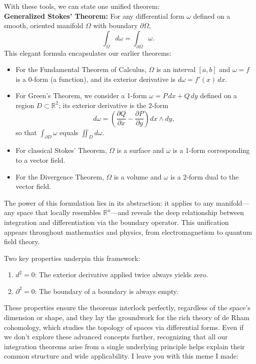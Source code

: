\noindent With these tools, we can state one unified theorem: \\

\noindent \textbf{Generalized Stokes' Theorem:} For any differential form \(\omega\) defined on a smooth, oriented manifold \(\Omega\) with boundary \(\partial\Omega\),
\[
\int_\Omega d\omega = \int_{\partial\Omega} \omega.
\]
This elegant formula encapsulates our earlier theorems:
\begin{itemize}
    \item For the Fundamental Theorem of Calculus, \(\Omega\) is an interval \([a,b]\) and \(\omega = f\) is a 0-form (a function), and its exterior derivative is \(d\omega = f'(x)\,dx\).
    \item For Green's Theorem, we consider a 1-form \(\omega = P\,dx + Q\,dy\) defined on a region \(D \subset \mathbb{R}^2\); its exterior derivative is the 2-form 
    \[
    d\omega = \left(\frac{\partial Q}{\partial x} - \frac{\partial P}{\partial y}\right) dx \wedge dy,
    \]
    so that \(\int_{\partial D} \omega\) equals \(\iint_D d\omega\).
    \item For classical Stokes' Theorem, \(\Omega\) is a surface and \(\omega\) is a 1-form corresponding to a vector field.
    \item For the Divergence Theorem, \(\Omega\) is a volume and \(\omega\) is a 2-form dual to the vector field.
\end{itemize}

\noindent The power of this formulation lies in its abstraction: it applies to any manifold—any space that locally resembles \(\mathbb{R}^n\)—and reveals the deep relationship between integration and differentiation via the boundary operator. This unification appears throughout mathematics and physics, from electromagnetism to quantum field theory.

\noindent Two key properties underpin this framework:
\begin{enumerate}
    \item \(d^2 = 0\): The exterior derivative applied twice always yields zero.
    \item \(\partial^2 = 0\): The boundary of a boundary is always empty.
\end{enumerate}

\noindent These properties ensure the theorems interlock perfectly, regardless of the space's dimension or shape, and they lay the groundwork for the rich theory of de Rham cohomology, which studies the topology of spaces via differential forms. Even if we don't explore these advanced concepts further, recognizing that all our integration theorems arise from a single underlying principle helps explain their common structure and wide applicability. I leave you with this meme I made:


